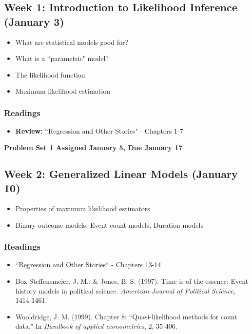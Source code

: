\documentclass[11pt, article, oneside]{memoir}
\theoremstyle{Assumption}
\begin{document}
\subsection{Week 1: Introduction to Likelihood Inference (January 3)}

\begin{itemize}
  \item What are statistical models good for?
  \item What is a ``parametric" model?
  \item The likelihood function 
  \item Maximum likelihood estimation
\end{itemize}

\subsubsection*{Readings}

\begin{itemize}
\item \textbf{Review:} ``Regression and Other Stories" - Chapters 1-7
\end{itemize}

\textbf{Problem Set 1 Assigned January 5, Due January 17}

\subsection{Week 2: Generalized Linear Models (January 10)}

\begin{itemize}
\item Properties of maximum likelihood estimators
\item Binary outcome models, Event count models, Duration models
\end{itemize}

\subsubsection*{Readings}

\begin{itemize}
\item ``Regression and Other Stories`` - Chapters 13-14
\item Box-Steffensmeier, J. M., \& Jones, B. S. (1997). Time is of the essence: Event history models in political science. \textit{American Journal of Political Science}, 1414-1461.
\item Wooldridge, J. M. (1999). Chapter 8: ``Quasi-likelihood methods for count data." In \textit{Handbook of applied econometrics}, 2, 35-406.
\end{itemize}
\end{document}
